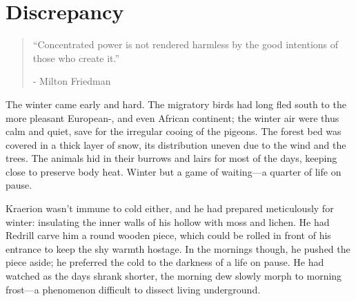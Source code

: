 \chapter{Discrepancy}

\vspace{-1.3cm}
\begin{localsize}{10}
	\begin{quote}
	“Concentrated power is not rendered harmless by the good intentions of those who create it.” 
		\begin{flushright}- Milton Friedman \end{flushright}
	\end{quote} 
\end{localsize}
\vspace{1cm}

The winter came early and hard. The migratory birds had long fled south to the more pleasant European-, and even African continent; the winter air were thus calm and quiet, save for the irregular cooing of the pigeons. The forest bed was covered in a thick layer of snow, its distribution uneven due to the wind and the trees. The animals hid in their burrows and lairs for most of the days, keeping close to preserve body heat. Winter but a game of waiting---a quarter of life on pause.

Kraerion wasn't immune to cold either, and he had prepared meticulously for winter: insulating the inner walls of his hollow with moss and lichen. He had Redrill carve him a round wooden piece, which could be rolled in front of his entrance to keep the shy warmth hostage. In the mornings though, he pushed the piece aside; he preferred the cold to the darkness of a life on pause. He had watched as the days shrank shorter, the morning dew slowly morph to morning frost---a phenomenon difficult to dissect living underground. 